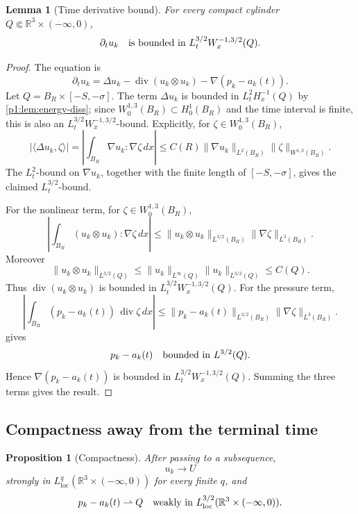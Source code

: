 \documentclass[11pt]{amsart}
\theoremstyle{plain}
\newtheorem{lemma}[lemma]{Lemma}
\newtheorem{proposition}[proposition]{Proposition}
\theoremstyle{definition}
\theoremstyle{remark}
\numberwithin{equation}{section}
\newcommand{\R}{\mathbb R}
\newcommand{\loc}{\mathrm{loc}}
\newcommand{\divergence}{\operatorname{div}}
\begin{document}
\begin{lemma}[Time derivative bound]\label{p1:lem:time-derivative}
For every compact cylinder \(Q\Subset\R^3\times(-\infty,0)\),
\[
   \partial_tu_k
   \quad\hbox{is bounded in }L^{3/2}_tW^{-1,3/2}_x(Q).
\]
\end{lemma}

\begin{proof}
The equation is
\[
   \partial_tu_k
   =
   \Delta u_k-\divergence(u_k\otimes u_k)-\nabla(p_k-a_k(t)).
\]
Let \(Q=B_R\times[-S,-\sigma]\).  The term \(\Delta u_k\) is bounded in
\(L^2_tH^{-1}_x(Q)\) by \cref{p1:lem:energy-diss}; since
\(W^{1,3}_0(B_R)\subset H^1_0(B_R)\) and the time interval is finite, this is
also an \(L^{3/2}_tW^{-1,3/2}_x\)-bound.  Explicitly, for
\(\zeta\in W^{1,3}_0(B_R)\),
\[
   |\langle\Delta u_k,\zeta\rangle|
   =
   \left|\int_{B_R}\nabla u_k:\nabla\zeta\,dx\right|
   \le
   C(R)\|\nabla u_k\|_{L^2(B_R)}\|\zeta\|_{W^{1,3}(B_R)}.
\]
The \(L^2_t\)-bound on \(\nabla u_k\), together with the finite length of
\([-S,-\sigma]\), gives the claimed \(L^{3/2}_t\)-bound.

For the nonlinear term, for
\(\zeta\in W^{1,3}_0(B_R)\),
\[
   \left|\int_{B_R}(u_k\otimes u_k):\nabla\zeta\,dx\right|
   \le
   \|u_k\otimes u_k\|_{L^{3/2}(B_R)}
   \|\nabla\zeta\|_{L^3(B_R)}.
\]
Moreover
\[
   \|u_k\otimes u_k\|_{L^{3/2}(Q)}
   \le
   \|u_k\|_{L^\infty(Q)}\|u_k\|_{L^{3/2}(Q)}
   \le C(Q).
\]
Thus \(\divergence(u_k\otimes u_k)\) is bounded in
\(L^{3/2}_tW^{-1,3/2}_x(Q)\).
For the pressure term,
\[
   \left|\int_{B_R}(p_k-a_k(t))\,\divergence\zeta\,dx\right|
   \le
   \|p_k-a_k(t)\|_{L^{3/2}(B_R)}
   \|\nabla\zeta\|_{L^3(B_R)}.
\]
 gives
\[
   p_k-a_k(t)\quad\hbox{bounded in }L^{3/2}(Q).
\]
Hence \(\nabla(p_k-a_k(t))\) is bounded in
\(L^{3/2}_tW^{-1,3/2}_x(Q)\).  Summing the three terms gives the result.
\end{proof}

\subsection{Compactness away from the terminal time}

\begin{proposition}[Compactness]\label{p1:prop:compactness}
After passing to a subsequence,
\[
   u_k\to U
\]
strongly in \(L^q_{\loc}(\R^3\times(-\infty,0))\) for every finite \(q\), and
\[
   p_k-a_k(t)\rightharpoonup Q
   \quad\hbox{weakly in }L^{3/2}_{\loc}(\R^3\times(-\infty,0)).
\]
\end{proposition}
\end{document}
